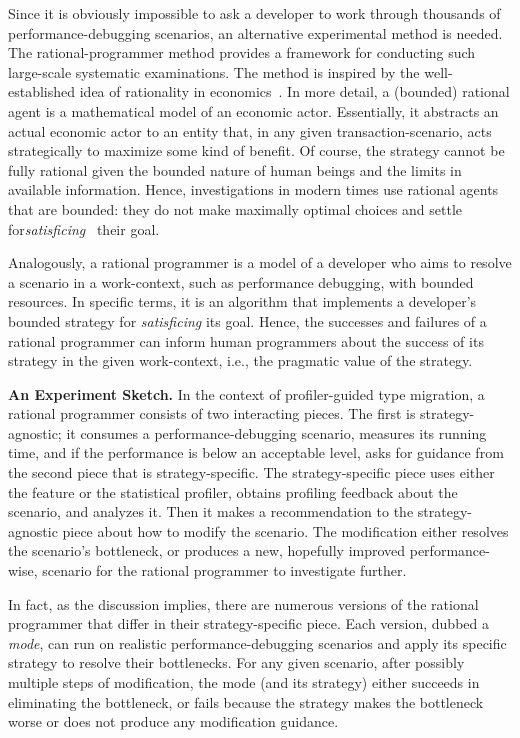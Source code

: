 Since it is obviously impossible to ask a developer to work through thousands of
performance-debugging scenarios, an alternative experimental method is needed.
The rational-programmer method provides a framework for conducting such
large-scale systematic examinations. The method is inspired by the
well-established idea of rationality in economics~\cite{mill1874essays,
henrich2001search}.  In more detail, a (bounded) rational agent is a
mathematical model of an economic actor. Essentially, it abstracts an actual
economic actor to an entity that, in any given transaction-scenario, acts
strategically to maximize some kind of benefit.  Of course, the strategy cannot
be fully rational given the bounded nature of human beings and the limits in
available information. Hence, investigations in modern times use rational agents
that are bounded: they do not make maximally optimal choices and settle
for\emph{satisficing}~\cite{hs:satisfice} their goal.

Analogously, a rational programmer is a model of a developer who aims to resolve
a scenario in a work-context, such as performance debugging, with bounded resources. In
specific terms, it is an algorithm that implements a developer's bounded
strategy for \emph{satisficing} its goal.  Hence, the successes and failures of
a rational programmer can inform human programmers about the success of
its strategy in the given work-context, i.e., the pragmatic value of the
strategy.




\bigskip

\noindent\textbf{An Experiment Sketch.} In the context of profiler-guided
type migration, a rational programmer consists of two interacting pieces.
The first is strategy-agnostic; it consumes a performance-debugging
scenario, measures its running time, and if the performance is below an
acceptable level, asks for guidance from the second piece that is
strategy-specific. The strategy-specific piece uses either the feature or
the statistical profiler, obtains profiling feedback about the scenario,
and analyzes it. Then it makes a recommendation to the strategy-agnostic
piece about how to modify the scenario. The modification either resolves
the scenario's bottleneck, or produces a new, hopefully improved performance-wise,
scenario for the rational programmer to investigate further. 

In fact, as the discussion implies, there are numerous versions of  the
rational programmer that differ in their strategy-specific piece. Each
version, dubbed a \emph{mode}, can run on realistic performance-debugging
scenarios and apply its specific strategy to resolve their bottlenecks.
For any given scenario, after possibly multiple steps of modification, the
mode (and its strategy) either succeeds in eliminating the bottleneck, or
fails because the strategy makes the bottleneck worse or does not produce
any modification guidance. 

